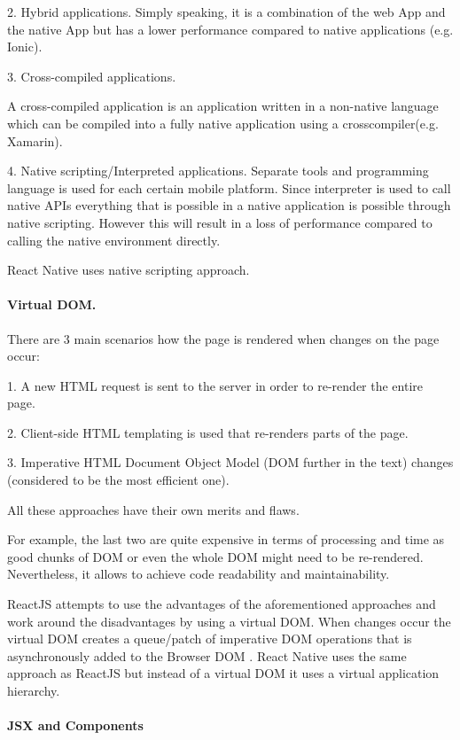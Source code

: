2. Hybrid applications.
Simply speaking, it is a combination of the web App and the native App but has a lower performance compared to
native applications (e.g. Ionic). 

3. Cross-compiled applications.

A cross-compiled application is an application written in a non-native language which can be compiled into a fully native application using a crosscompiler(e.g. Xamarin). 

4. Native scripting/Interpreted  applications.
Separate tools and programming language is used for each certain mobile platform.
Since interpreter is used to call native APIs everything that is possible in a native application is possible through native scripting. However this will result in a loss of performance compared to calling the native environment directly.

React Native uses native scripting approach.

\paragraph{Virtual DOM.}
There are 3 main scenarios how the page is rendered when changes on the page occur:

1. A new HTML request is sent to the server in order to re-render the entire page. 

2. Client-side HTML templating is used that re-renders parts of the page. 

3. Imperative HTML Document Object Model (DOM further in the text) changes (considered to be the most efficient one).

All these approaches have their own merits and flaws. 

For example, the last two are quite expensive in terms of processing and time as good chunks of DOM or even the whole DOM might need to be re-rendered.
Nevertheless, it allows to achieve code readability and maintainability. 

ReactJS attempts to use the advantages of the aforementioned approaches and work around the disadvantages by using a virtual DOM. When changes occur the virtual DOM creates a queue/patch
of imperative DOM operations that is asynchronously added to the Browser DOM \cite{danielsson2016react}.
React Native  uses the same
approach as ReactJS but instead of a
virtual DOM it uses a virtual application hierarchy.

\paragraph{JSX and Components}

